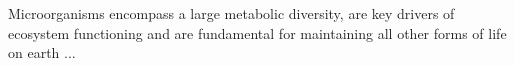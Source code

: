 
Microorganisms encompass a large metabolic diversity, are key drivers of ecosystem functioning and are fundamental for maintaining all other forms of life on earth ...